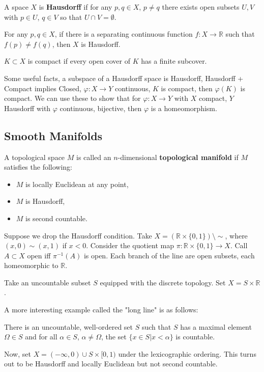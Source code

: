 \documentclass[12pt]{scrartcl}
\newcommand{\R}{\mathbb{R}}
\let \phi \varphi
\begin{document}
\begin{definition} A space $X$ is \textbf{Hausdorff} if for any $p, q \in X$, $p \ne q$ there exists open subsets $U, V$ with $p \in U$, $q \in V$ so that $U \cap V = \emptyset$.
\end{definition}

\begin{exercise} For any $p, q \in X$, if there is a separating continuous function $f: X \to \R$ such that $f(p) \ne f(q)$, then $X$ is Hausdorff.
\end{exercise}

\begin{definition} $K \subset X$ is compact if every open cover of $K$ has a finite subcover.  
\end{definition}

Some useful facts, a subspace of a Hausdorff space is Hausdorff, Hausdorff + Compact implies Closed, $\phi: X \to Y$ continuous, $K$ is compact, then $\phi(K)$ is compact.  We can use these to show that for $\phi: X \to Y$ with $X$ compact, $Y$ Hausdorff with $\phi$ continuous, bijective, then $\phi$ is a homeomorphism.  
\subsection{Smooth Manifolds}
\begin{definition} A topological space $M$ is called an $n$-dimensional \textbf{topological manifold} if $M$ satisfies the following:
\begin{itemize}
\item $M$ is locally Euclidean at any point,
\item $M$ is Hausdorff,
\item $M$ is second countable.
\end{itemize}
\end{definition}

\begin{example} Suppose we drop the Hausdorff condition.  Take $X = (\R \times \{0, 1\}) \setminus \sim$, where  $(x, 0) \sim (x, 1)$ if $x < 0$.  Consider the quotient map $\pi: \R\times\{0, 1\} \to X$.  Call $A \subset X$ open iff $\pi^{-1}(A)$ is open.  Each branch of the line are open subsets, each homeomorphic to $\R$.  
\end{example}

\begin{example} Take an uncountable subset $S$ equipped with the discrete topology.  Set $X = S \times \R$.  

A more interesting example called the "long line" is as follows: 
\begin{lemma} There is an uncountable, well-ordered set $S$ such that $S$ has a maximal element $\Omega \in S$ and for all $\alpha \in S$, $\alpha \ne \Omega$, the set $\{x \in S| x < \alpha\}$ is countable.  
\end{lemma}
Now, set $X = (-\infty, 0) \cup S \times [0, 1)$ under the lexicographic ordering.  This turns out to be Hausdorff and locally Euclidean but not second countable.  
\end{example}
\end{document}
